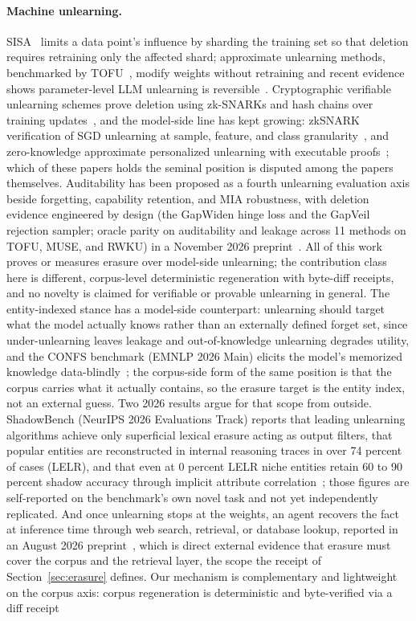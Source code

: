 \documentclass{article}
\begin{document}
\paragraph{Machine unlearning.}
SISA~\cite{bourtoule2020machine} limits a data point's influence by sharding the training set so that deletion requires retraining only the affected shard; approximate unlearning methods, benchmarked by TOFU~\cite{maini2024tofu}, modify weights without retraining and recent evidence shows parameter-level LLM unlearning is reversible~\cite{xu2025reversibility}. Cryptographic verifiable unlearning schemes prove deletion using zk-SNARKs and hash chains over training updates~\cite{eisenhofer2022verifiable,maheri2025edge}, and the model-side line has kept growing: zkSNARK verification of SGD unlearning at sample, feature, and class granularity~\cite{wang2025zkunlearner}, and zero-knowledge approximate personalized unlearning with executable proofs~\cite{maheri2025zkapex}; which of these papers holds the seminal position is disputed among the papers themselves. Auditability has been proposed as a fourth unlearning evaluation axis beside forgetting, capability retention, and MIA robustness, with deletion evidence engineered by design (the GapWiden hinge loss and the GapVeil rejection sampler; oracle parity on auditability and leakage across 11 methods on TOFU, MUSE, and RWKU) in a November 2026 preprint~\cite{tiwary2026auditable}. All of this work proves or measures erasure over model-side unlearning; the contribution class here is different, corpus-level deterministic regeneration with byte-diff receipts, and no novelty is claimed for verifiable or provable unlearning in general. The entity-indexed stance has a model-side counterpart: unlearning should target what the model actually knows rather than an externally defined forget set, since under-unlearning leaves leakage and out-of-knowledge unlearning degrades utility, and the CONFS benchmark (EMNLP 2026 Main) elicits the model's memorized knowledge data-blindly~\cite{kim2026confs}; the corpus-side form of the same position is that the corpus carries what it actually contains, so the erasure target is the entity index, not an external guess. Two 2026 results argue for that scope from outside. ShadowBench (NeurIPS 2026 Evaluations Track) reports that leading unlearning algorithms achieve only superficial lexical erasure acting as output filters, that popular entities are reconstructed in internal reasoning traces in over 74 percent of cases (LELR), and that even at 0 percent LELR niche entities retain 60 to 90 percent shadow accuracy through implicit attribute correlation~\cite{maharjan2026shadowbench}; those figures are self-reported on the benchmark's own novel task and not yet independently replicated. And once unlearning stops at the weights, an agent recovers the fact at inference time through web search, retrieval, or database lookup, reported in an August 2026 preprint~\cite{chen2026toolunlearning}, which is direct external evidence that erasure must cover the corpus and the retrieval layer, the scope the receipt of Section~\ref{sec:erasure} defines. Our mechanism is complementary and lightweight on the corpus axis: corpus regeneration is deterministic and byte-verified via a diff receipt 
\end{document}
